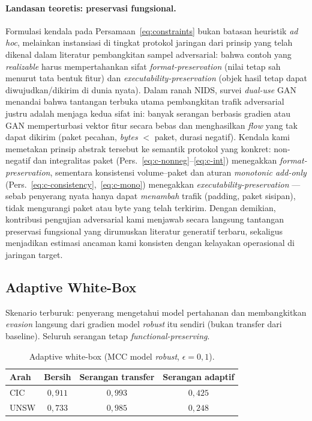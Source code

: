 \documentclass[11pt,a4paper]{article}
\begin{document}
\paragraph{Landasan teoretis: preservasi fungsional.} Formulasi kendala pada
Persamaan~\eqref{eq:constraints} bukan batasan heuristik \emph{ad hoc}, melainkan
instansiasi di tingkat protokol jaringan dari prinsip yang telah dikenal dalam
literatur pembangkitan sampel adversarial: bahwa contoh yang \emph{realizable}
harus mempertahankan sifat \emph{format-preservation} (nilai tetap sah menurut
tata bentuk fitur) dan \emph{executability-preservation} (objek hasil tetap dapat
diwujudkan/dikirim di dunia nyata). Dalam ranah NIDS, survei \emph{dual-use}
GAN~\cite{alauthman,alajlan} menandai bahwa tantangan terbuka utama pembangkitan
trafik adversarial justru adalah menjaga kedua sifat ini: banyak serangan
berbasis gradien atau GAN memperturbasi vektor fitur secara bebas dan
menghasilkan \emph{flow} yang tak dapat dikirim (paket pecahan, \emph{bytes} $<$
paket, durasi negatif). Kendala kami memetakan prinsip abstrak tersebut ke
semantik protokol yang konkret: non-negatif dan integralitas paket
(Pers.~\eqref{eq:c-nonneg}--\eqref{eq:c-int}) menegakkan
\emph{format-preservation}, sementara konsistensi volume--paket dan aturan
\emph{monotonic add-only} (Pers.~\eqref{eq:c-consistency},~\eqref{eq:c-mono})
menegakkan \emph{executability-preservation} --- sebab penyerang nyata hanya
dapat \emph{menambah} trafik (padding, paket sisipan), tidak mengurangi paket
atau byte yang telah terkirim. Dengan demikian, kontribusi pengujian adversarial
kami menjawab secara langsung tantangan preservasi fungsional yang dirumuskan
literatur generatif terbaru, sekaligus menjadikan estimasi ancaman kami
konsisten dengan kelayakan operasional di jaringan target.

\subsection{Adaptive White-Box}
\label{sec:awb}

Skenario terburuk: penyerang mengetahui model pertahanan dan membangkitkan
\emph{evasion} langsung dari gradien model \emph{robust} itu sendiri (bukan
transfer dari baseline). Seluruh serangan tetap \emph{functional-preserving}.

\begin{table}[h]
\centering
\caption{Adaptive white-box (MCC model \emph{robust}, $\epsilon=0{,}1$).}
\label{tab:awb}
\begin{tabular}{lccc}
\toprule
Arah & Bersih & Serangan transfer & Serangan adaptif \\
\midrule
CIC  & $0{,}911$ & $0{,}993$ & $0{,}425$ \\
UNSW & $0{,}733$ & $0{,}985$ & $0{,}248$ \\
\bottomrule
\end{tabular}
\end{table}
\end{document}
